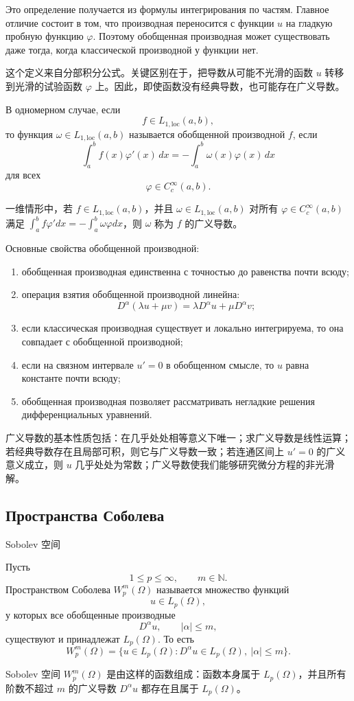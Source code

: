 \documentclass[12pt,a4paper]{article}
\newcommand{\zh}[1]{\par\noindent #1\par}
\begin{document}
Это определение получается из формулы интегрирования по частям. Главное отличие состоит в том, что производная переносится с функции \(u\) на гладкую пробную функцию \(\varphi\). Поэтому обобщенная производная может существовать даже тогда, когда классической производной у функции нет.
\zh{这个定义来自分部积分公式。关键区别在于，把导数从可能不光滑的函数 \(u\) 转移到光滑的试验函数 \(\varphi\) 上。因此，即使函数没有经典导数，也可能存在广义导数。}

В одномерном случае, если
\[
f\in L_{1,\mathrm{loc}}(a,b),
\]
то функция \(\omega\in L_{1,\mathrm{loc}}(a,b)\) называется обобщенной производной \(f\), если
\[
\int_a^b f(x)\varphi'(x)\,dx
=
-
\int_a^b \omega(x)\varphi(x)\,dx
\]
для всех
\[
\varphi\in C_c^\infty(a,b).
\]
\zh{一维情形中，若 \(f\in L_{1,\mathrm{loc}}(a,b)\)，并且 \(\omega\in L_{1,\mathrm{loc}}(a,b)\) 对所有 \(\varphi\in C_c^\infty(a,b)\) 满足 \(\int_a^b f\varphi' dx=-\int_a^b \omega\varphi dx\)，则 \(\omega\) 称为 \(f\) 的广义导数。}

Основные свойства обобщенной производной:
\begin{enumerate}[leftmargin=2em]
\item обобщенная производная единственна с точностью до равенства почти всюду;
\item операция взятия обобщенной производной линейна:
\[
D^\alpha(\lambda u+
\mu v)=\lambda D^\alpha u+\mu D^\alpha v;
\]
\item если классическая производная существует и локально интегрируема, то она совпадает с обобщенной производной;
\item если на связном интервале \(u'=0\) в обобщенном смысле, то \(u\) равна константе почти всюду;
\item обобщенная производная позволяет рассматривать негладкие решения дифференциальных уравнений.
\end{enumerate}
\zh{广义导数的基本性质包括：在几乎处处相等意义下唯一；求广义导数是线性运算；若经典导数存在且局部可积，则它与广义导数一致；若连通区间上 \(u'=0\) 的广义意义成立，则 \(u\) 几乎处处为常数；广义导数使我们能够研究微分方程的非光滑解。}

\subsection*{Пространства Соболева}
\zh{Sobolev 空间}
Пусть
\[
1\le p\le\infty,
\qquad
m\in\mathbb N.
\]
Пространством Соболева \(W_p^m(\Omega)\) называется множество функций
\[
u\in L_p(\Omega),
\]
у которых все обобщенные производные
\[
D^\alpha u,
\qquad |\alpha|\le m,
\]
существуют и принадлежат \(L_p(\Omega)\). То есть
\[
W_p^m(\Omega)=
\{u\in L_p(\Omega):D^\alpha u\in L_p(\Omega),\ |\alpha|\le m\}.
\]
\zh{Sobolev 空间 \(W_p^m(\Omega)\) 是由这样的函数组成：函数本身属于 \(L_p(\Omega)\)，并且所有阶数不超过 \(m\) 的广义导数 \(D^\alpha u\) 都存在且属于 \(L_p(\Omega)\)。}
\end{document}
